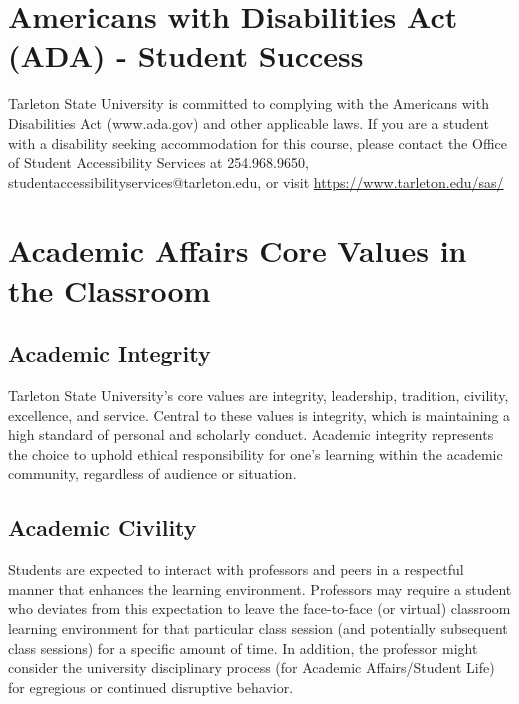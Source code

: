 \documentclass[10pt]{article}
\begin{document}
\section*{Americans with Disabilities Act (ADA) - Student Success}
\label{sec:orga4f8060}

Tarleton State University is committed to complying with the Americans with Disabilities Act (www.ada.gov) and other applicable laws. If you are a student with a disability seeking accommodation for this course, please contact the Office of Student Accessibility Services at 254.968.9650, studentaccessibilityservices@tarleton.edu,  or visit \url{https://www.tarleton.edu/sas/} 

\section*{Academic Affairs Core Values in the Classroom}
\label{sec:org42b310e}

\subsection*{Academic Integrity}
\label{sec:orgc20ed5b}
Tarleton State University's core values are integrity, leadership, tradition, civility, excellence, and service.  Central to these values is integrity, which is maintaining a high standard of personal and scholarly conduct.  Academic integrity represents the choice to uphold ethical responsibility for one’s learning within the academic community, regardless of audience or situation.

\subsection*{Academic Civility}
\label{sec:org095af6b}
Students are expected to interact with professors and peers in a respectful manner that enhances the learning environment. Professors may require a student who deviates from this expectation to leave the face-to-face (or virtual) classroom learning environment for that particular class session (and potentially subsequent class sessions) for a specific amount of time. In addition, the professor might consider the university disciplinary process (for Academic Affairs/Student Life) for egregious or continued disruptive behavior.
\end{document}
